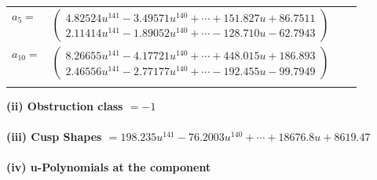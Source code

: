 \documentclass[1p]{elsarticle_modified}
\theoremstyle{definition}
\begin{document}
\begin{tabular}{m{7pt} m{180pt} m{7pt} m{180pt} }
\flushright $a_{5}=$&$\begin{pmatrix}4.82524 u^{141}-3.49571 u^{140}+\cdots+151.827 u+86.7511\\2.11414 u^{141}-1.89052 u^{140}+\cdots-128.710 u-62.7943\end{pmatrix}$ \\
\flushright $a_{10}=$&$\begin{pmatrix}8.26655 u^{141}-4.17721 u^{140}+\cdots+448.015 u+186.893\\2.46556 u^{141}-2.77177 u^{140}+\cdots-192.455 u-99.7949\end{pmatrix}$\\&\end{tabular}
\flushleft \textbf{(ii) Obstruction class $= -1$}\\~\\
\flushleft \textbf{(iii) Cusp Shapes $= 198.235 u^{141}-76.2003 u^{140}+\cdots+18676.8 u+8619.47$}\\~\\
\newpage\renewcommand{\arraystretch}{1}
\flushleft \textbf{(iv) u-Polynomials at the component}\newline \\
\end{document}
